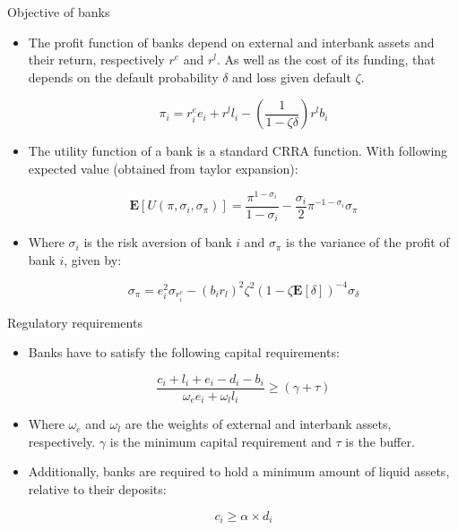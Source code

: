 \documentclass{beamer}
\begin{document}
\begin{frame}{Objective of banks}

    \begin{itemize}
        \item The profit function of banks depend on external and interbank assets and their return, respectively $r^e$ and $r^l$. As well as the cost of its funding, that depends on the default probability $\delta$ and loss given default $\zeta$.
        
        \[\pi_i = r_{i}^e e_i + r^l l_i - (\frac{1}{1 - \zeta \delta}) r^l b_i\]

        \item The utility function of a bank is a standard CRRA function. With following expected value (obtained from taylor expansion):
        
        \[\mathbf{E}[U(\pi, \sigma_i, \sigma_\pi)] = \frac{\pi^{1-\sigma_i}}{1 - \sigma_i} - \frac{\sigma_i}{2} \pi^{-1-\sigma_i} \sigma_\pi\]

        \item Where $\sigma_i$ is the risk aversion of bank $i$ and $\sigma_\pi$ is the variance of the profit of bank $i$, given by:
        
        \[\sigma_\pi = e_i^2 \sigma_{r_i^e} - (b_i  r_l)^2  \zeta^2 (1 - \zeta \mathbf{E}[\delta])^{-4}  \sigma_\delta\]

    \end{itemize}
    
\end{frame}

\begin{frame}{Regulatory requirements}

    \begin{itemize}
        \item Banks have to satisfy the following capital requirements:
        
        \[\frac{c_i + l_i + e_i - d_i - b_i}{\omega_e e_i + \omega_l l_i} \geq (\gamma + \tau)\]

        \item Where $\omega_e$ and $\omega_l$ are the weights of external and interbank assets, respectively. $\gamma$ is the minimum capital requirement and $\tau$ is the buffer.
        
        \item Additionally, banks are required to hold a minimum amount of liquid assets, relative to their deposits:
        
        \[c_i \geq \alpha \times d_i\]

    \end{itemize}

\end{frame}
\end{document}
